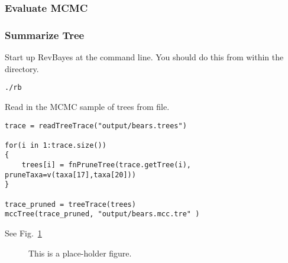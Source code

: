\medskip
\subsubsection{Evaluate MCMC}\label{subsub:RB-EvalMCMC}



\medskip
\subsubsection{Summarize Tree}\label{subsub:RB-SummarizeTree}


Start up RevBayes at the command line. You should do this from within the  directory.
{\tt \begin{snugshade*}
\begin{lstlisting}
./rb
\end{lstlisting}
\end{snugshade*}}

Read in the MCMC sample of trees from file.
{\tt \begin{snugshade*}
\begin{lstlisting}
trace = readTreeTrace("output/bears.trees")

for(i in 1:trace.size())
{
    trees[i] = fnPruneTree(trace.getTree(i), pruneTaxa=v(taxa[17],taxa[20]))
}

trace_pruned = treeTrace(trees)
mccTree(trace_pruned, "output/bears.mcc.tre" )
\end{lstlisting}
\end{snugshade*}}

See Fig.\ \ref{fig:IcyTreeSumm}

\begin{figure}[h!]
\centering
{}
\caption{\small This is a place-holder figure.}
\label{fig:IcyTreeSumm}
\end{figure}





